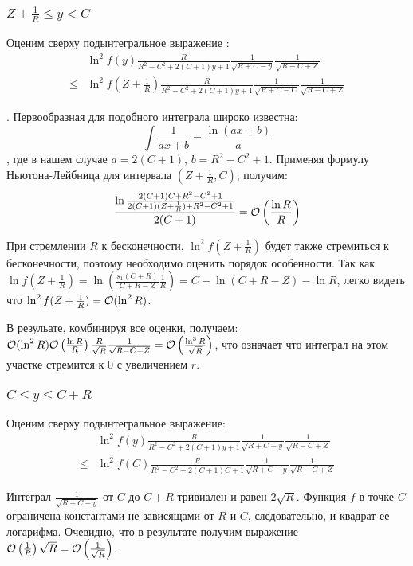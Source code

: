 \subsubsection{$Z + \frac{1}{R} \le y < C$}
Оценим сверху подынтегральное выражение :
\begin{align*}
       & \ln^2 f(y) \frac{R}{R^2 - C^2 + 2 (C + 1) y + 1} \frac{1}{\sqrt{R + C - y}} \frac{1}{\sqrt{R - C + Z}}
\\ \le & \ln^2 f(Z + \frac{1}{R}) \frac{R}{R^2 - C^2 + 2 (C + 1) y + 1} \frac{1}{\sqrt{R + C - C}} \frac{1}{\sqrt{R - C + Z}}
\end{align*}

. Первообразная для подобного интеграла широко известна:
\[
\int \frac{1}{a x + b} = \frac{\ln (a x + b)}{a}
\]
, где в нашем случае $a = 2 (C + 1)$, $b = R^2 - C^2 + 1$. Применяя формулу Ньютона-Лейбница для интервала $(Z + \frac{1}{R}, C)$, получим:
\[
\frac{\ln \frac{2 (C + 1) C + R^2 - C^2 + 1}{2 (C + 1) (Z + \frac{1}{R}) + R^2 - C^2 + 1}}{2 (C + 1)} = \mathcal{O}\left( \frac{\ln R}{R} \right)
\]

При стремлении $R$ к бесконечности, $\ln^2 f(Z + \frac{1}{R})$ будет также стремиться к бесконечности, поэтому необходимо оценить порядок особенности. Так как $\ln f(Z + \frac{1}{R}) = \ln \left( \frac{s_1(C + R)}{C + R - Z} \frac{1}{R} \right) = C - \ln (C + R - Z) - \ln R$, легко видеть что $\ln^2 f(Z + \frac{1}{R}) = \mathcal{O} (\ln^2 R)$.

В резульате, комбинируя все оценки, получаем: $\mathcal{O} (\ln^2 R) \mathcal{O}\left( \frac{\ln R}{R} \right) \frac{R}{\sqrt{R}} \frac{1}{\sqrt{R - C + Z}} = \mathcal{O}\left( \frac{\ln^3 R}{\sqrt{R}} \right)$, что означает что интеграл на этом участке стремится к $0$ с увеличением $r$.

\subsubsection{$C \le y \le C + R$}

Оценим сверху подынтегральное выражение:
\begin{align*}
       & \ln^2 f(y) \frac{R}{R^2 - C^2 + 2 (C + 1) y + 1} \frac{1}{\sqrt{R + C - y}} \frac{1}{\sqrt{R - C + Z}}
\\ \le & \ln^2 f(C) \frac{R}{R^2 - C^2 + 2 (C + 1) C + 1} \frac{1}{\sqrt{R + C - y}} \frac{1}{\sqrt{R - C + Z}}
\end{align*}

Интеграл $\frac{1}{\sqrt{R + C - y}}$ от $C$ до $C + R$ тривиален и равен $2 \sqrt{R}$. Функция $f$ в точке $C$ ограничена константами не зависящами от $R$ и $C$, следовательно, и квадрат ее логарифма. Очевидно, что в результате получим выражение $\mathcal{O} \left( \frac{1}{R} \right) \sqrt R = \mathcal{O} \left( \frac{1}{\sqrt{R}} \right)$.